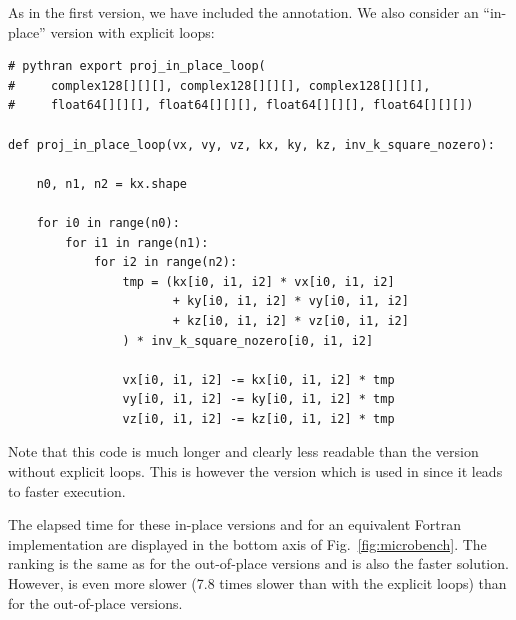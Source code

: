 As in the first version, we have included the  annotation.
%
We also consider an ``in-place'' version with explicit loops:
\begin{verbatim}
# pythran export proj_in_place_loop(
#     complex128[][][], complex128[][][], complex128[][][],
#     float64[][][], float64[][][], float64[][][], float64[][][])

def proj_in_place_loop(vx, vy, vz, kx, ky, kz, inv_k_square_nozero):

    n0, n1, n2 = kx.shape

    for i0 in range(n0):
        for i1 in range(n1):
            for i2 in range(n2):
                tmp = (kx[i0, i1, i2] * vx[i0, i1, i2]
                       + ky[i0, i1, i2] * vy[i0, i1, i2]
                       + kz[i0, i1, i2] * vz[i0, i1, i2]
                ) * inv_k_square_nozero[i0, i1, i2]

                vx[i0, i1, i2] -= kx[i0, i1, i2] * tmp
                vy[i0, i1, i2] -= ky[i0, i1, i2] * tmp
                vz[i0, i1, i2] -= kz[i0, i1, i2] * tmp

\end{verbatim}
Note that this code is much longer and clearly less readable than the version
without explicit loops.  This is however the version which is used in
 since it leads to faster execution.

The elapsed time for these in-place versions and for an equivalent Fortran
implementation are displayed in the bottom axis of Fig.~\ref{fig:microbench}.
%
The ranking is the same as for the out-of-place versions and  is also
the faster solution.
%
However,  is even more slower (7.8 times slower than 
with the explicit loops) than for the out-of-place versions.

